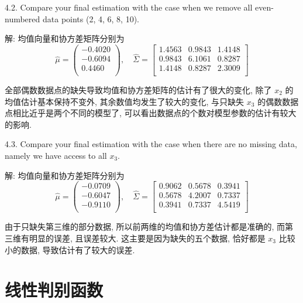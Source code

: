 \documentclass[openany]{ctexbook}
\theoremstyle{kaiti}
\theoremstyle{normal}
\begin{document}
4.2. Compare your final estimation with the case when we remove all even-numbered data points (2, 4, 6, 8, 10).

解: 均值向量和协方差矩阵分别为
\begin{equation}
  \hat{\mu}=
  \begin{pmatrix}
    -0.4020\\
    -0.6094\\
    0.4460\\
  \end{pmatrix},
  \quad
  \hat{\Sigma}=
  \begin{bmatrix}
    1.4563 & 0.9843 & 1.4148 \\
    0.9843 & 6.1061 & 0.8287 \\
    1.4148 & 0.8287 & 2.3009 \\
  \end{bmatrix}
\end{equation}

全部偶数数据点的缺失导致均值和协方差矩阵的估计有了很大的变化, 除了 $x_2$ 的均值估计基本保持不变外, 其余数值均发生了较大的变化, 与只缺失 $x_3$ 的偶数数据点相比近乎是两个不同的模型了, 可以看出数据点的个数对模型参数的估计有较大的影响.

4.3. Compare your final estimation with the case when there are no missing data, namely we have access to all $x_3$.

解: 均值向量和协方差矩阵分别为
\begin{equation}
  \hat{\mu}=
  \begin{pmatrix}
    -0.0709\\
    -0.6047\\
    -0.9110\\
  \end{pmatrix},
  \quad
  \hat{\Sigma}=
  \begin{bmatrix}
    0.9062 & 0.5678 & 0.3941 \\
    0.5678 & 4.2007 & 0.7337 \\
    0.3941 & 0.7337 & 4.5419 \\
  \end{bmatrix}
\end{equation}

由于只缺失第三维的部分数据, 所以前两维的均值和协方差估计都是准确的, 而第三维有明显的误差, 且误差较大. 这主要是因为缺失的五个数据, 恰好都是 $x_3$ 比较小的数据, 导致估计有了较大的误差.


\chapter{线性判别函数}
\end{document}
